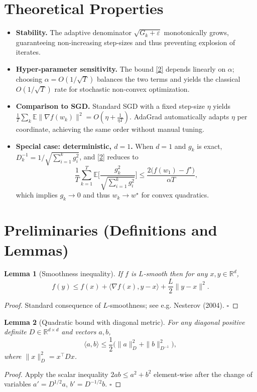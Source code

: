 \documentclass{article}
\newtheorem{lemma}{Lemma}
\newcommand{\E}{\mathbb{E}}
\newcommand{\R}{\mathbb{R}}
\begin{document}
\section*{Theoretical Properties}
\begin{itemize}[leftmargin=*]
\item \textbf{Stability.} The adaptive denominator $\sqrt{G_k+\varepsilon}$ monotonically grows, guaranteeing non‑increasing step‑sizes and thus preventing explosion of iterates.
\item \textbf{Hyper‑parameter sensitivity.} The bound \eqref{2} depends linearly on $\alpha$; choosing $\alpha=O(1/\sqrt{T})$ balances the two terms and yields the classical $O(1/\sqrt{T})$ rate for stochastic non‑convex optimization.
\item \textbf{Comparison to SGD.} Standard SGD with a fixed step‑size $\eta$ yields $\frac{1}{T}\sum_{k}\E\|\nabla f(w_k)\|^2 = O(\eta + \frac{1}{\eta T})$. AdaGrad automatically adapts $\eta$ per coordinate, achieving the same order without manual tuning.
\item \textbf{Special case: deterministic, $d=1$.} When $d=1$ and $g_k$ is exact, $D_k^{-1}=1/\sqrt{\sum_{i=1}^{k}g_i^{2}}$, and \eqref{2} reduces to
\[
\frac{1}{T}\sum_{k=1}^{T}\E\!\bigl[\frac{g_k^{2}}{\sqrt{\sum_{i=1}^{k}g_i^{2}}}\bigr]
\le \frac{2\bigl(f(w_1)-f^{\star}\bigr)}{\alpha T},
\]
which implies $g_k\to0$ and thus $w_k\to w^{\star}$ for convex quadratics.
\end{itemize}

\section*{Preliminaries (Definitions and Lemmas)}
\begin{lemma}[Smoothness inequality]\label{lem:smooth}
If $f$ is $L$‑smooth then for any $x,y\in\R^{d}$,
\[
f(y) \le f(x) + \langle \nabla f(x),y-x\rangle + \frac{L}{2}\|y-x\|^{2}.
\tag{3}
\]
\end{lemma}
\begin{proof}
Standard consequence of $L$‑smoothness; see e.g. Nesterov (2004). \hfill $\square$
\end{proof}

\begin{lemma}[Quadratic bound with diagonal metric]\label{lem:diag}
For any diagonal positive definite $D\in\R^{d\times d}$ and vectors $a,b$,
\[
\langle a,b\rangle \le \frac12\bigl(\|a\|_{D}^{2}+\|b\|_{D^{-1}}^{2}\bigr),
\tag{4}
\]
where $\|x\|_{D}^{2}=x^{\top}Dx$.
\end{lemma}
\begin{proof}
Apply the scalar inequality $2ab\le a^{2}+b^{2}$ element‑wise after the change of variables $a'=D^{1/2}a$, $b'=D^{-1/2}b$. \hfill $\square$
\end{proof}
\end{document}
